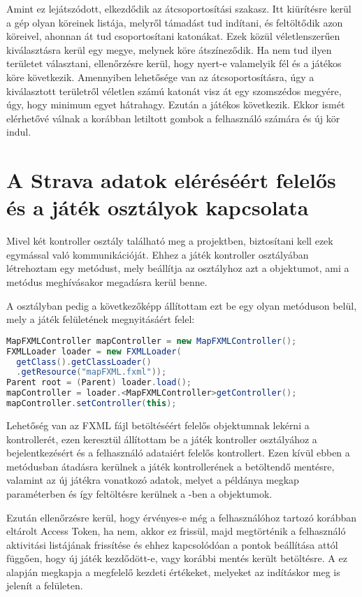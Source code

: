 Amint ez lejátszódott, elkezdődik az átcsoportosítási szakasz.
Itt kiürítésre kerül a gép olyan köreinek listája, melyről támadást tud indítani, és feltöltődik azon köreivel, ahonnan át tud csoportosítani katonákat.
Ezek közül véletlenszerűen kiválasztásra kerül egy megye, melynek köre átszíneződik.
Ha nem tud ilyen területet választani, ellenőrzésre kerül, hogy nyert-e valamelyik fél és a játékos köre következik.
Amennyiben lehetősége van az átcsoportosításra, úgy a kiválasztott területről véletlen számú katonát visz át egy szomszédos megyére, úgy, hogy minimum egyet hátrahagy.
Ezután a játékos következik.
Ekkor ismét elérhetővé válnak a korábban letiltott gombok a felhasználó számára és új kör indul. 

\section{A Strava adatok eléréséért felelős és a játék osztályok kapcsolata}

Mivel két kontroller osztály található meg a projektben, biztosítani kell ezek egymással való kommunikációját.
Ehhez a játék kontroller osztályában létrehoztam egy metódust, mely beállítja az osztályhoz azt a  objektumot, ami a metódus meghívásakor megadásra kerül benne. 

A  osztályban pedig a következőképp állítottam ezt be egy olyan metóduson belül, mely a játék felületének megnyitásáért felel: 

\begin{lstlisting}[language=Java]
MapFXMLController mapController = new MapFXMLController();
FXMLLoader loader = new FXMLLoader(
  getClass().getClassLoader()
  .getResource("mapFXML.fxml"));
Parent root = (Parent) loader.load();
mapController = loader.<MapFXMLController>getController();
mapController.setController(this);
\end{lstlisting}

Lehetőség van az FXML fájl betöltéséért felelős  objektumnak lekérni a kontrollerét, ezen keresztül állítottam be a játék kontroller osztályához a bejelentkezésért és a felhasználó adataiért felelős kontrollert.
Ezen kívül ebben a metódusban átadásra kerülnek a játék kontrollerének a betöltendő mentésre, valamint az új játékra vonatkozó adatok, melyet a  példánya megkap paraméterben és így feltöltésre kerülnek a -ben a  objektumok. 

Ezután ellenőrzésre kerül, hogy érvényes-e még a felhasználóhoz tartozó korábban eltárolt Access Token, ha nem, akkor ez frissül, majd megtörténik a felhasználó aktivitási listájának frissítése és ehhez kapcsolódóan a pontok beállítása attól függően, hogy új játék kezdődött-e, vagy korábbi mentés került betöltésre.
A  ez alapján megkapja a megfelelő kezdeti értékeket, melyeket az indításkor meg is jelenít a felületen. 


